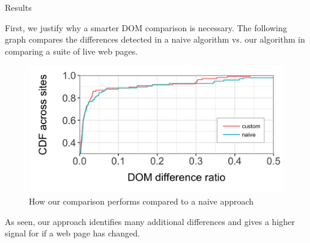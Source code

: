 \documentclass[final]{beamer}
\newlength{\onecolwid}
\begin{document}
\begin{frame}[t]
\begin{columns}[t]
\begin{column}{\onecolwid}





\begin{block}{Results}

First, we justify why a smarter DOM comparison is necessary. The following graph compares the differences detected in a naive algorithm vs. our algorithm in comparing a suite of live web pages.

\begin{figure}
\vspace{0.5cm}
\includegraphics[width=0.6\linewidth]{naive_comparison_plot.png}
\caption{How our comparison performs compared to a naive approach}
\end{figure}

As seen, our approach identifies many additional differences and gives a higher signal for if a web page has changed. 


\end{block}
\end{column}
\end{columns}
\end{frame}
\end{document}
